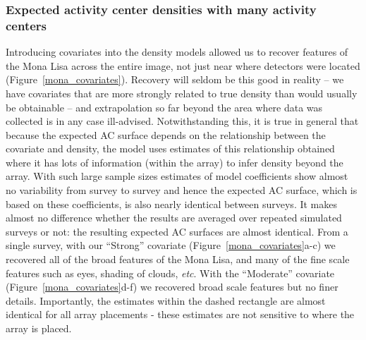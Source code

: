 \documentclass[useAMS,usenatbib,referee]{biom}
\begin{document}
\subsubsection{Expected activity center densities with many activity centers}

Introducing covariates into the density models allowed us to recover features of the Mona Lisa across the entire image, not just near where detectors were located (Figure~\ref{mona_covariates}). Recovery will seldom be this good in reality -- we have covariates that are more strongly related to true density than would usually be obtainable -- and extrapolation so far beyond the area where data was collected is in any case ill-advised. Notwithstanding this, it is true in general that because the expected AC surface depends on the relationship between the covariate and density, the model uses estimates of this relationship obtained where it has lots of information (within the array) to infer density beyond the array. With such large sample sizes estimates of model coefficients show almost no variability from survey to survey and hence the expected AC surface, which is based on these coefficients, is also nearly identical between surveys. It makes almost no difference whether the results are averaged over repeated simulated surveys or not: the resulting expected AC surfaces are almost identical. From a single survey, with our ``Strong'' covariate (Figure~\ref{mona_covariates}a-c) we recovered all of the broad features of the Mona Lisa, and many of the fine scale features such as eyes, shading of clouds, {\it etc}. With the ``Moderate'' covariate (Figure~\ref{mona_covariates}d-f) we recovered broad scale features but no finer details. Importantly, the estimates within the dashed rectangle are almost identical for all array placements - these estimates are not sensitive to where the array is placed.

\end{document}
